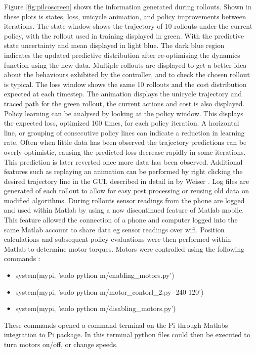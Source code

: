 \documentclass[twoside,twocolumn,12pt]{article}
\begin{document}
Figure \ref{fig:pilcoscreen} shows the information generated during rollouts. Shown in these plots is  states, loss, unicycle animation, and policy improvements between iterations. The state window shows the trajectory of 10 rollouts under the current policy, with the rollout used in training displayed in green. With the predictive state uncertainty and mean displayed in light blue. The dark blue region indicates the updated predictive distribution after re-optimising the dynamics function using the new data. Multiple rollouts are displayed to get a better idea about the behaviours exhibited by the controller, and to check the chosen rollout is typical. The loss window shows the same 10 rollouts and the cost distribution expected at each timestep. The animation displays the unicycle trajectory and traced path for the green rollout, the current actions and cost is also displayed. 
Policy learning can be analysed by looking at the policy window. This displays the expected loss, optimized 100 times, for each policy iteration. A horizontal line, or grouping of consecutive policy lines can indicate a reduction in learning rate. Often when little data has been observed the trajectory predictions can be overly optimistic, causing the predicted loss decrease rapidly in some iterations. This prediction is later reverted once more data has been observed.
\newline
Additional features such as replaying an animation can be performed by right clicking the desired trajectory line in the GUI, described in detail in by Weiser \cite{eric}. 
Log files are generated of each rollout to allow for easy post processing or reusing old data on modified algorithms.
\newline
During rollouts sensor readings from the phone are logged and used within Matlab by using a now discontinued feature of Matlab mobile. This feature allowed the connection of a phone and computer logged into the same Matlab account to share data eg sensor readings over wifi.
\newline
Position calculations and subsequent policy evaluations were then performed within Matlab to determine motor torques. Motors were controlled using the following commands \cite{arsalan} \cite{motorcmd}: 
\begin{itemize}
\item system(mypi, 'sudo python m/enabling\_motors.py')
\item system(mypi, 'sudo python m/motor\_contorl\_2.py -240 120')
\item system(mypi, 'sudo python m/disabling\_motors.py')
\end{itemize}
These commands opened a command terminal on the Pi through Matlabs integration to Pi package. In this terminal python files could then be executed to turn motors on/off, or change speeds.
\end{document}
